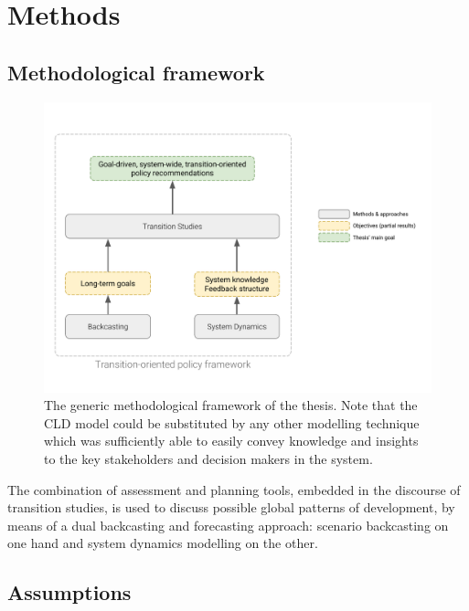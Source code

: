 \chapter{Methods}
\label{c:methods}

\section{Methodological framework}
\label{s:methods:framework}


\begin{figure}[h]
\centering
\includegraphics[trim=1cm 2cm 1.5cm 3cm,clip,width=\linewidth]{figures/methods-goals.pdf}
\caption[Thesis' methodological framework]{The generic methodological framework of the thesis. Note that the CLD model could be substituted by any other modelling technique which was sufficiently able to easily convey knowledge and insights to the key stakeholders and decision makers in the system.}
\label{fig:thesis-aim-methods}
\end{figure}

The combination of assessment and planning tools, embedded in the discourse of transition studies, is used to discuss possible global patterns of development, by means of a dual backcasting and forecasting approach: scenario backcasting on one hand and system dynamics modelling on the other.

\section{Assumptions}
\label{s:methods:assumptions}

